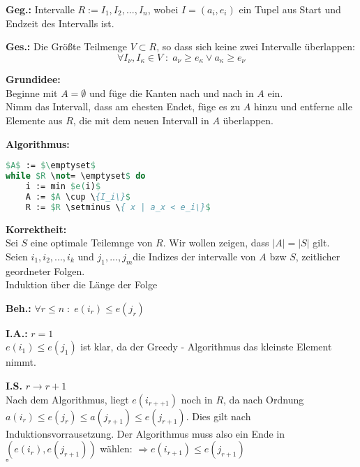 \begin{description}

\item{\bfseries Geg.:} Intervalle $R := {I_1 , I_2 , ... , I_n}$, wobei $I= (a_i, e_i)$ ein Tupel aus Start und Endzeit des Intervalls ist.

\item{\bfseries Ges.:} Die Größte Teilmenge $V \subset R$, so dass sich keine zwei Intervalle überlappen:
$$
\forall I_\nu, I_\kappa \in V \; : \; a_\nu \geq e_\kappa \lor a_\kappa \geq e_\nu
$$

\item{\bfseries Grundidee:} \\
Beginne mit $A = \emptyset$ und füge die Kanten nach und nach in $A$ ein.\\

Nimm das Intervall, dass am ehesten Endet, füge es zu $A$ hinzu und entferne alle Elemente aus $R$, die mit dem neuen Intervall in $A$ überlappen.

\item{\bfseries Algorithmus:}\\

\begin{lstlisting}[language=Pascal]
$A$ := $\emptyset$
while $R \not= \emptyset$ do
	i := min $e(i)$
	A := $A \cup \{I_i\}$
	R := $R \setminus \{ x | a_x < e_i\}$
\end{lstlisting}

\item{\bfseries Korrektheit:}\\
Sei $S$ eine optimale Teilemnge von $R$. Wir wollen zeigen, dass $|A| = |S|$ gilt.\\

Seien $i_1 , i_2 , ... , i_k$ und $j_1, ... , j_m$die Indizes der intervalle von $A$ bzw $S$, zeitlicher geordneter Folgen.\\

Induktion über die Länge der Folge

\begin{description}

\item{\bfseries Beh.:} $\forall r \leq n \; : \; e(i_r) \leq e(j_r)$

\item{\bfseries I.A.:} $r=1$\\
$e(i_1) \leq e(j_1)$ ist klar, da der Greedy - Algorithmus das kleinste Element nimmt.

\item{\bfseries I.S.} $r \longrightarrow r+1$\\
Nach dem Algorithmus, liegt $e(i_{r++1})$ noch in $R$, da nach Ordnung $a(i_r) \leq e(j_r) \leq a(j_{r+1}) \leq e(j_{r+1})$. Dies gilt nach Induktionsvorrausetzung. Der Algorithmus muss also ein Ende in $(e(i_r),e(j_{r+1}))$ wählen: $\Rightarrow e(i_{r+1}) \leq e(j_{r+1})$\\ \mbox{} \hfill $\square$


\end{description}
\end{description}
